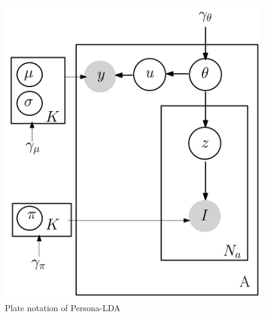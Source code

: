 \begin{figure}[!htb]
\setlength{\belowcaptionskip}{-18pt}
     \centering
     \includegraphics[width=0.6\linewidth]{personaModel}
     \caption{Plate notation of Persona-LDA}
     \label{fig:persona-lda}
\end{figure}
%
%
%
%
